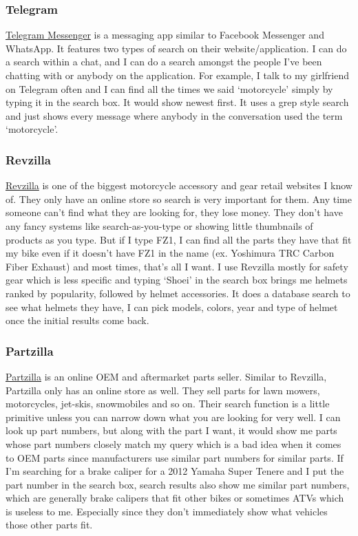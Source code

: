 \documentclass[10pt,letterpaper,bibliography=totocnumbered]{scrartcl}
\begin{document}
\subsubsection{Telegram}
\href{www.telegram.org}{Telegram Messenger} is a messaging app similar to Facebook Messenger and WhatsApp. It features two types of search on their website/application. I can do a search within a chat, and I can do a search amongst the people I've been chatting with or anybody on the application. For example, I talk to my girlfriend on Telegram often and I can find all the times we said `motorcycle' simply by typing it in the search box. It would show newest first. It uses a grep style search and just shows every message where anybody in the conversation used the term `motorcycle'.

\subsubsection{Revzilla}
\href{www.revzilla.com}{Revzilla} is one of the biggest motorcycle accessory and gear retail websites I know of. They only have an online store so search is very important for them. Any time someone can't find what they are looking for, they lose money. They don't have any fancy systems like search-as-you-type or showing little thumbnails of products as you type. But if I type FZ1, I can find all the parts they have that fit my bike even if it doesn't have FZ1 in the name (ex. Yoshimura TRC Carbon Fiber Exhaust) and most times, that's all I want. I use Revzilla mostly for safety gear which is less specific and typing `Shoei' in the search box brings me helmets ranked by popularity, followed by helmet accessories. It does a database search to see what helmets they have, I can pick models, colors, year and type of helmet once the initial results come back. 

\subsubsection{Partzilla}
\href{www.partzilla.com}{Partzilla} is an online OEM and aftermarket parts seller. Similar to Revzilla, Partzilla only has an online store as well. They sell parts for lawn mowers, motorcycles, jet-skis, snowmobiles and so on. Their search function is a little primitive unless you can narrow down what you are looking for very well. I can look up part numbers, but along with the part I want, it would show me parts whose part numbers closely match my query which is a bad idea when it comes to OEM parts since manufacturers use similar part numbers for similar parts. If I'm searching for a brake caliper for a 2012 Yamaha Super Tenere and I put the part number in the search box, search results also show me similar part numbers, which are generally brake calipers that fit other bikes or sometimes ATVs which is useless to me. Especially since they don't immediately show what vehicles those other parts fit. \\
\end{document}

